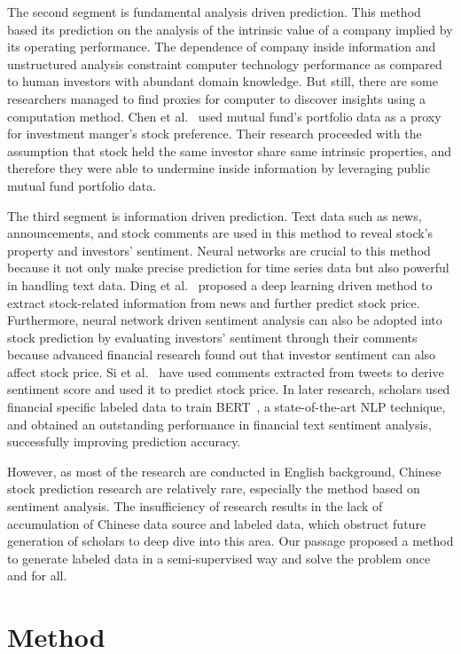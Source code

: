 \documentclass[runningheads]{llncs}
\begin{document}
The second segment is fundamental analysis driven prediction. This method based its prediction on the analysis of the intrinsic value of a company implied by its operating performance. The dependence of company inside information and unstructured analysis constraint computer technology performance as compared to human investors with abundant domain knowledge. But still, there are some researchers managed to find proxies for computer to discover insights using a computation method. Chen et al.~\cite{investmentbev} used mutual fund's portfolio data as a proxy for investment manger's stock preference. Their research proceeded with the assumption that stock held the same investor share same intrinsic properties, and therefore they were able to undermine inside information by leveraging public mutual fund portfolio data.

The third segment is information driven prediction. Text data such as news, announcements, and stock comments are used in this method to reveal stock's property and investors' sentiment. Neural networks are crucial to this method because it not only make precise prediction for time series data but also powerful in handling text data. Ding et al.~\cite{dlnews} proposed a deep learning driven method to extract stock-related information from news and further predict stock price. Furthermore, neural network driven sentiment analysis can also be adopted into stock prediction by evaluating investors' sentiment through their comments because advanced financial research found out that investor sentiment can also affect stock price. Si et al.~\cite{sentimentprediction} have used comments extracted from tweets to derive sentiment score and used it to predict stock price. In later research, scholars used financial specific labeled data to train BERT~\cite{finbert}, a state-of-the-art NLP technique, and obtained an outstanding performance in financial text sentiment analysis, successfully improving prediction accuracy. 

However, as most of the research are conducted in English background, Chinese stock prediction research are relatively rare, especially the method based on sentiment analysis. The insufficiency of research results in the lack of accumulation of Chinese data source and labeled data, which obstruct future generation of scholars to deep dive into this area. Our passage proposed a method to generate labeled data in a semi-supervised way and solve the problem once and for all. 

\section{Method}
\end{document}

